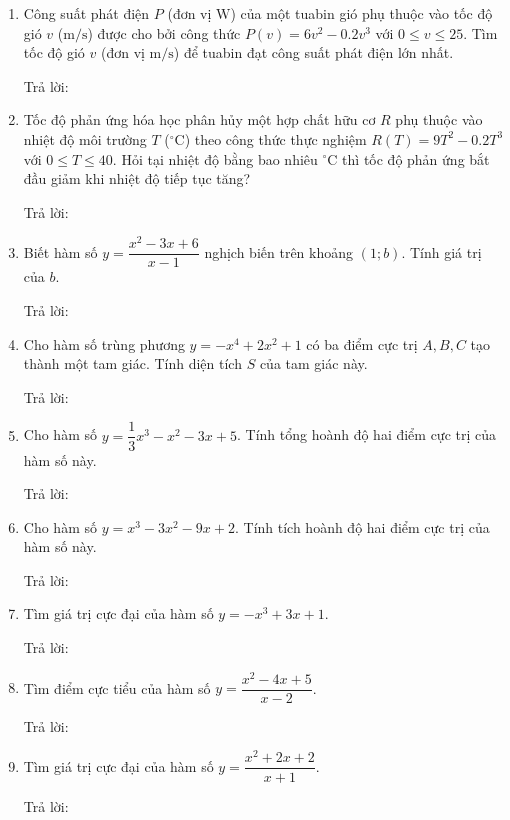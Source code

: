 \documentclass[12pt]{article}
\newcommand{\otraloi}{\underline{\hspace{5cm}}}
\begin{document}
\begin{enumerate}[label=\textbf{Câu \arabic*.}]
		\item Công suất phát điện $P$ (đơn vị $\text{W}$) của một tuabin gió phụ thuộc vào tốc độ gió $v$ ($\text{m/s}$) được cho bởi công thức $P(v) = 6v^2 - 0.2v^3$ với $0 \le v \le 25$. Tìm tốc độ gió $v$ (đơn vị $\text{m/s}$) để tuabin đạt công suất phát điện lớn nhất.
		\par Trả lời: \otraloi
		
		\item Tốc độ phản ứng hóa học phân hủy một hợp chất hữu cơ $R$ phụ thuộc vào nhiệt độ môi trường $T$ ($^\circ\text{C}$) theo công thức thực nghiệm $R(T) = 9T^2 - 0.2T^3$ với $0 \le T \le 40$. Hỏi tại nhiệt độ bằng bao nhiêu $^\circ\text{C}$ thì tốc độ phản ứng bắt đầu giảm khi nhiệt độ tiếp tục tăng?
		\par Trả lời: \otraloi
		
		\item Biết hàm số $y = \dfrac{x^2 - 3x + 6}{x - 1}$ nghịch biến trên khoảng $(1; b)$. Tính giá trị của $b$.
		\par Trả lời: \otraloi
		
		\item Cho hàm số trùng phương $y = -x^4 + 2x^2 + 1$ có ba điểm cực trị $A, B, C$ tạo thành một tam giác. Tính diện tích $S$ của tam giác này.
		\par Trả lời: \otraloi
		
		
		\item Cho hàm số $y = \dfrac{1}{3}x^3 - x^2 - 3x + 5$. Tính tổng hoành độ hai điểm cực trị của hàm số này.
		\par Trả lời: \otraloi
		
		\item Cho hàm số $y = x^3 - 3x^2 - 9x + 2$. Tính tích hoành độ hai điểm cực trị của hàm số này.
		\par Trả lời: \otraloi
		
		\item Tìm giá trị cực đại của hàm số $y = -x^3 + 3x + 1$.
		\par Trả lời: \otraloi
		
		\item Tìm điểm cực tiểu của hàm số $y = \dfrac{x^2 - 4x + 5}{x - 2}$.
		\par Trả lời: \otraloi
		
		\item Tìm giá trị cực đại của hàm số $y = \dfrac{x^2 + 2x + 2}{x + 1}$.
		\par Trả lời: \otraloi
		

\end{enumerate}
\end{document}
